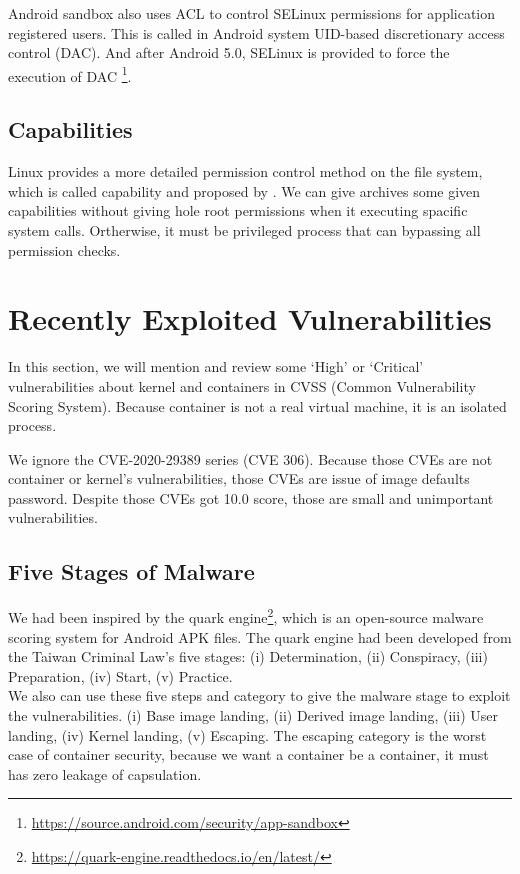 Android sandbox also uses ACL to control SELinux permissions for application registered users.
This is called in Android system UID-based discretionary access control (DAC).
And after Android 5.0, SELinux is provided to force the execution of DAC
\footnote{\url{https://source.android.com/security/app-sandbox}}.

\subsection{Capabilities}
\label{Capabilities}
Linux provides a more detailed permission control method on the file system, which is called
capability and proposed by \citeauthor{6234805}. We can give archives some given capabilities
without giving hole root permissions when it executing spacific system calls. Ortherwise, it 
must be privileged process that can bypassing all permission checks.

\section{Recently Exploited Vulnerabilities}
In this section, we will mention and review some `High' or `Critical' vulnerabilities
about kernel and containers in CVSS (Common Vulnerability Scoring System).
Because container is not a real virtual machine, it is an isolated process.

We ignore the CVE-2020-29389 series (CVE 306). Because those CVEs are not container or kernel's
vulnerabilities, those CVEs are issue of image defaults password. Despite those CVEs got 10.0 score,
those are small and unimportant vulnerabilities.

\subsection{Five Stages of Malware}
\label{Five_stage_of_malware}
We had been inspired by the quark engine\footnote{\url{https://quark-engine.readthedocs.io/en/latest/}},
which is an open-source malware scoring system for Android APK files. The quark
engine had been developed from the Taiwan Criminal Law's five stages:
(\Rn{1}) Determination, (\Rn{2}) Conspiracy, (\Rn{3}) Preparation, (\Rn{4}) Start, (\Rn{5}) Practice.\\

We also can use these five steps and category to give the malware stage to exploit the vulnerabilities.
(\Rn{1}) Base image landing, (\Rn{2}) Derived image landing, (\Rn{3}) User landing, (\Rn{4}) Kernel landing,
(\Rn{5}) Escaping. The escaping category is the worst case of container security, because we want a
container be a container, it must has zero leakage of capsulation.

